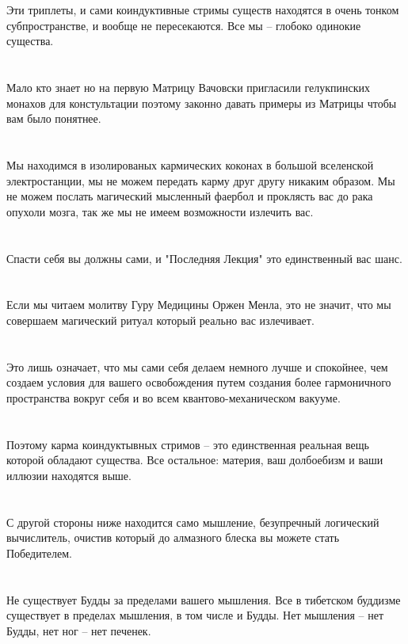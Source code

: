 \\
\\
Эти триплеты, и сами коиндуктивные стримы существ находятся в очень тонком субпространстве, и вообще не пересекаются. Все мы -- глобоко одинокие существа.\\
\\
\\
Мало кто знает но на первую Матрицу Вачовски пригласили гелукпинских монахов для констультации поэтому законно давать примеры из Матрицы чтобы вам было понятнее.\\
\\
\\
Мы находимся в изолированых кармических коконах в большой вселенской электростанции, мы не можем передать карму друг другу никаким образом. Мы не можем послать магический мысленный фаербол и проклясть вас до рака опухоли мозга, так же мы не имеем возможности излечить вас.\\
\\
\\
Спасти себя вы должны сами, и "Последняя Лекция" это единственный вас шанс.\\
\\
\\
Если мы читаем молитву Гуру Медицины Оржен Менла, это не значит, что мы совершаем магический ритуал который реально вас излечивает.\\
\\
\\
Это лишь означает, что мы сами себя делаем немного лучше и спокойнее, чем создаем условия для вашего освобождения путем создания более гармоничного пространства вокруг себя и во всем квантово-механическом вакууме.\\
\\
\\
Поэтому карма коиндуктывных стримов -- это единственная реальная вещь которой обладают существа. Все остальное: материя, ваш долбоебизм и ваши иллюзии находятся выше.\\
\\
\\
С другой стороны ниже находится само мышление, безупречный логический вычислитель, очистив который до алмазного блеска вы можете стать Победителем.\\
\\
\\
Не существует Будды за пределами вашего мышления. Все в тибетском буддизме существует в пределах мышления, в том числе и Будды. Нет мышления -- нет Будды, нет ног -- нет печенек.\\
